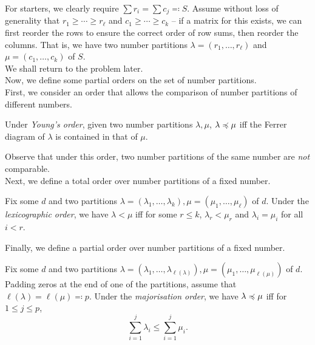 	For starters, we clearly require $\sum r_i = \sum c_j \eqqcolon S$. Assume without loss of generality that $r_1 \ge \cdots \ge r_\ell$ and $c_1 \ge \cdots \ge c_k$ -- if a matrix for this exists, we can first reorder the rows to ensure the correct order of row sums, then reorder the columns. That is, we have two number partitions $\lambda = (r_1,\ldots,r_\ell)$ and $\mu = (c_1,\ldots,c_k)$ of $S$.\\
	We shall return to the problem later.\\


	Now, we define some partial orders on the set of number partitions.\\
	First, we consider an order that allows the comparison of number partitions of different numbers.
	\begin{fdef}
		Under \emph{Young's order}, given two number partitions $\lambda,\mu$, $\lambda \preccurlyeq \mu$ iff the Ferrer diagram of $\lambda$ is contained in that of $\mu$.
	\end{fdef}
	Observe that under this order, two number partitions of the same number are \emph{not} comparable.\\

	Next, we define a total order over number partitions of a fixed number.
	\begin{fdef}
		Fix some $d$ and two partitions $\lambda = (\lambda_1,\ldots,\lambda_k),\mu = (\mu_1,\ldots,\mu_\ell)$ of $d$. Under the \emph{lexicographic order}, we have $\lambda < \mu$ iff for some $r \le k$, $\lambda_r < \mu_r$ and $\lambda_i = \mu_i$ for all $i < r$.
	\end{fdef}


	Finally, we define a partial order over number partitions of a fixed number.
	\begin{fdef}
		\label{def: majorisation order}
		Fix some $d$ and two partitions $\lambda = (\lambda_1,\ldots,\lambda_{\ell(\lambda)}),\mu = (\mu_1,\ldots,\mu_{\ell(\mu)})$ of $d$. Padding zeros at the end of one of the partitions, assume that $\ell(\lambda) = \ell(\mu) \eqqcolon p$. Under the \emph{majorisation order}, we have $\lambda \preccurlyeq \mu$ iff for $1 \le j \le p$,
		\[ \sum_{i=1}^j \lambda_i \le \sum_{i=1}^j \mu_i. \]
	\end{fdef}



